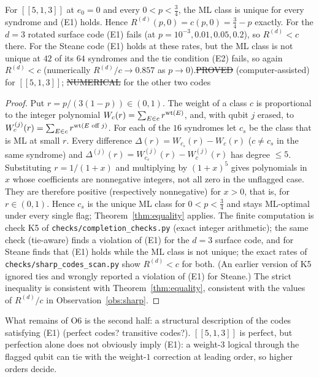 \begin{proposition}\label{prop:five-sharp}
For $[[5,1,3]]$ at $e_0=0$ and every $0<p<\tfrac34$, the ML class is unique for every syndrome and (E1) holds. Hence $R^{(d)}(p,0)=c(p,0)=\tfrac34-p$ exactly.
For the $d=3$ rotated surface code (E1) fails (at $p=10^{-3},0.01,0.05,0.2$), so $R^{(d)}<c$ there. For the Steane code (E1) holds at these rates, but the ML class is not unique at $42$ of its $64$ syndromes and the tie condition (E2) fails, so again $R^{(d)}<c$ (numerically $R^{(d)}/c\to0.857$ as $p\to0$).\hfill\st{PROVED} (computer-assisted) for $[[5,1,3]]$; \st{NUMERICAL} for the other two codes
\end{proposition}
\begin{proof}
Put $r=p/(3(1-p))\in(0,1)$. The weight of a class $c$ is proportional to the integer polynomial $W_c(r)=\sum_{E\in c}r^{\operatorname{wt}(E)}$, and, with qubit $j$ erased, to $W^{(j)}_c(r)=\sum_{E\in c}r^{\operatorname{wt}(E\text{ off }j)}$.
For each of the $16$ syndromes let $c_s$ be the class that is ML at small $r$. Every difference $\Delta(r)=W_{c_s}(r)-W_c(r)$ ($c\ne c_s$ in the same syndrome) and $\Delta^{(j)}(r)=W^{(j)}_{c_s}(r)-W^{(j)}_c(r)$ has degree $\le5$.
Substituting $r=1/(1+x)$ and multiplying by $(1+x)^5$ gives polynomials in $x$ whose coefficients are nonnegative integers, not all zero in the unflagged case. They are therefore positive (respectively nonnegative) for $x>0$, that is, for $r\in(0,1)$.
Hence $c_s$ is the unique ML class for $0<p<\tfrac34$ and stays ML-optimal under every single flag; Theorem~\ref{thm:equality} applies.
The finite computation is check K5 of \texttt{checks/completion\_checks.py} (exact integer arithmetic); the same check (tie-aware) finds a violation of (E1) for the $d=3$ surface code, and for Steane finds that (E1) holds while the ML class is not unique; the exact rates of \texttt{checks/sharp\_codes\_scan.py} show $R^{(d)}<c$ for both. (An earlier version of K5 ignored ties and wrongly reported a violation of (E1) for Steane.) The strict inequality is consistent with Theorem~\ref{thm:equality}, consistent with the values of $R^{(d)}/c$ in Observation~\ref{obs:sharp}.
\end{proof}

\noindent What remains of O6 is the second half: a structural description of the codes satisfying (E1) (perfect codes? transitive codes?). $[[5,1,3]]$ is perfect, but perfection alone does not obviously imply (E1): a weight-$3$ logical through the flagged qubit can tie with the weight-$1$ correction at leading order, so higher orders decide.


